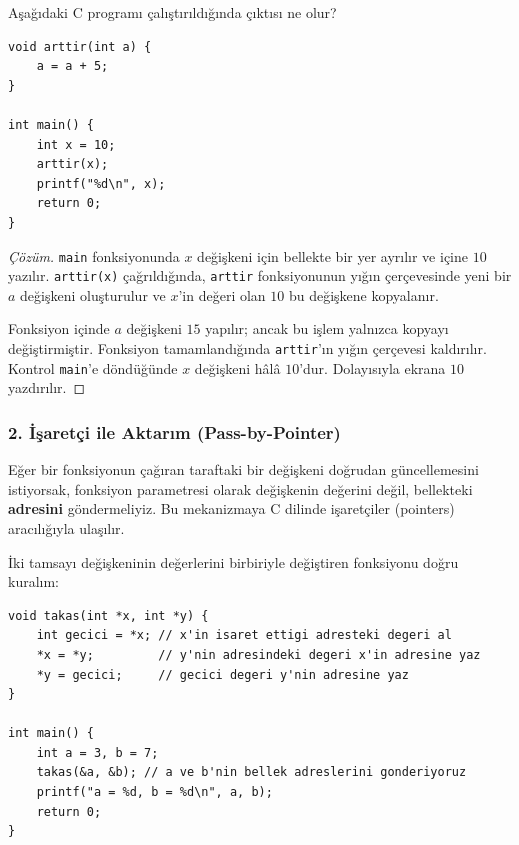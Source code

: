 \begin{example}
Aşağıdaki C programı çalıştırıldığında çıktısı ne olur?
\begin{lstlisting}[language=CTemel]
void arttir(int a) {
    a = a + 5;
}

int main() {
    int x = 10;
    arttir(x);
    printf("%d\n", x);
    return 0;
}
\end{lstlisting}
\end{example}

\begin{proof}[Çözüm]
\texttt{main} fonksiyonunda $x$ değişkeni için bellekte bir yer ayrılır ve içine $10$ yazılır. \texttt{arttir(x)} çağrıldığında, \texttt{arttir} fonksiyonunun yığın çerçevesinde yeni bir $a$ değişkeni oluşturulur ve $x$'in değeri olan $10$ bu değişkene kopyalanır.

Fonksiyon içinde $a$ değişkeni $15$ yapılır; ancak bu işlem yalnızca kopyayı değiştirmiştir. Fonksiyon tamamlandığında \texttt{arttir}'ın yığın çerçevesi kaldırılır. Kontrol \texttt{main}'e döndüğünde $x$ değişkeni hâlâ $10$'dur. Dolayısıyla ekrana $10$ yazdırılır.
\end{proof}

\subsubsection{2. İşaretçi ile Aktarım (Pass-by-Pointer)}

Eğer bir fonksiyonun çağıran taraftaki bir değişkeni doğrudan güncellemesini istiyorsak, fonksiyon parametresi olarak değişkenin değerini değil, bellekteki \textbf{adresini} göndermeliyiz. Bu mekanizmaya C dilinde işaretçiler (pointers) aracılığıyla ulaşılır.

\begin{example}
İki tamsayı değişkeninin değerlerini birbiriyle değiştiren fonksiyonu doğru kuralım:
\begin{lstlisting}[language=CTemel]
void takas(int *x, int *y) {
    int gecici = *x; // x'in isaret ettigi adresteki degeri al
    *x = *y;         // y'nin adresindeki degeri x'in adresine yaz
    *y = gecici;     // gecici degeri y'nin adresine yaz
}

int main() {
    int a = 3, b = 7;
    takas(&a, &b); // a ve b'nin bellek adreslerini gonderiyoruz
    printf("a = %d, b = %d\n", a, b);
    return 0;
}
\end{lstlisting}
\end{example}

